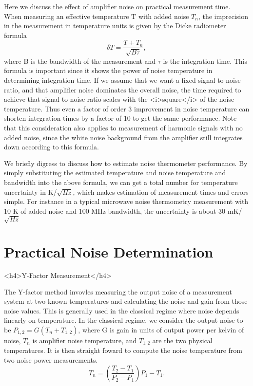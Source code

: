 \documentclass[11pt]{article}
\begin{document}
    	Here we discuss the effect of amplifier noise on practical measurement time.  When measuring an effective temperature T with added noise $T_n$, the imprecision in the measurement in temperature units is given by the Dicke radiometer formula
$$\delta T = \frac{T + T_n}{\sqrt{B\tau}},$$
where B is the bandwidth of the measurement and $\tau$ is the integration time.  This formula is important since it shows the power of noise temperature in determining integration time.  If we assume that we want a fixed signal to noise ratio, and that amplifier noise dominates the overall noise, the time required to achieve that signal to noise ratio scales with the <i>square</i> of the noise temperature.  Thus even a factor of order 3 improvement in noise temperature can shorten integration times by a factor of 10 to get the same performance.  Note that this consideration also applies to measurement of harmonic signals with no added noise, since the white noise background from the amplifier still integrates down according to this formula.  





    We briefly digress to discuss how to estimate noise thermometer performance.  By simply substituting the estimated temperature and noise temperature and bandwidth into the above formula, we can get a total number for temperature uncertainty in K/$\sqrt{Hz}$, which makes estimation of measurement times and errors simple.  For instance in a typical microwave noise thermometry measurement with 10 K of added noise and 100 MHz bandwidth, the uncertainty is about 30 mK/$\sqrt{Hz}$



\section{
Practical Noise Determination}
	<h4>Y-Factor Measurement</h4>



	The Y-factor method invovles measuring the output noise of a measurement system at two known temperatures and calculating the noise and gain from those noise values.  This is generally used in the classical regime where noise depends linearly on temperature.  In the classical regime, we consider the output noise to be $P_{1,2} = G(T_n + T_{1,2})$, where G is gain in units of output power per kelvin of noise, $T_n$ is amplifier noise temperature, and $T_{1,2}$ are the two physical temperatures.  It is then straight foward to compute the noise temperature from two noise power measurements.  
$$T_n = \left(\frac{T_2 - T_1}{P_2 - P_1}\right)P_1 - T_1.$$
\end{document}
